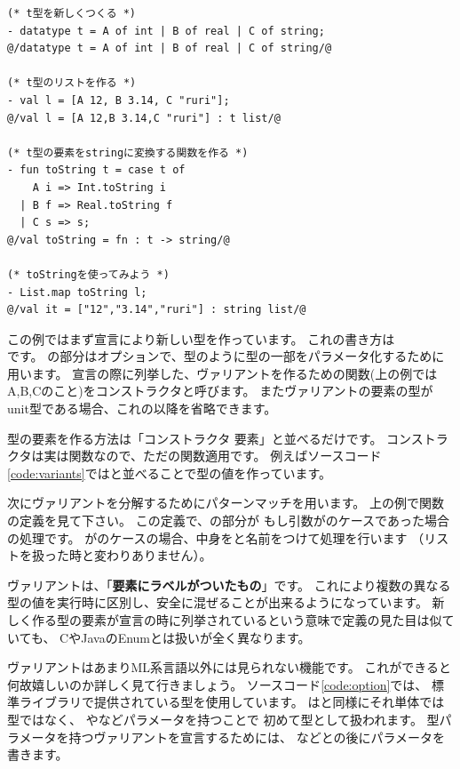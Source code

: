 \documentclass[11pt,a4paper]{jarticle}
\begin{document}
\begin{lstlisting}[caption=単純なヴァリアント,label=code:variants]
(* t型を新しくつくる *)
- datatype t = A of int | B of real | C of string;
@/datatype t = A of int | B of real | C of string/@

(* t型のリストを作る *)
- val l = [A 12, B 3.14, C "ruri"];
@/val l = [A 12,B 3.14,C "ruri"] : t list/@

(* t型の要素をstringに変換する関数を作る *)
- fun toString t = case t of
    A i => Int.toString i
  | B f => Real.toString f
  | C s => s;
@/val toString = fn : t -> string/@

(* toStringを使ってみよう *)
- List.map toString l;
@/val it = ["12","3.14","ruri"] : string list/@
\end{lstlisting}

この例ではまず宣言により新しい型を作っています。
これの書き方は\\です。
の部分はオプションで、型のように型の一部をパラメータ化するために用います。
宣言の際に列挙した、ヴァリアントを作るための関数(上の例ではA,B,Cのこと)をコンストラクタと呼びます。
またヴァリアントの要素の型がunit型である場合、これの以降を省略できます。

型の要素を作る方法は「コンストラクタ 要素」と並べるだけです。
コンストラクタは実は関数なので、ただの関数適用です。
例えばソースコード\ref{code:variants}ではと並べることで型の値を作っています。

次にヴァリアントを分解するためにパターンマッチを用います。
上の例で関数の定義を見て下さい。
この定義で、の部分が
もし引数がのケースであった場合の処理です。
がのケースの場合、中身をと名前をつけて処理を行います
（リストを扱った時と変わりありません）。

ヴァリアントは、「\textbf{要素にラベルがついたもの}」です。
これにより複数の異なる型の値を実行時に区別し、安全に混ぜることが出来るようになっています。
新しく作る型の要素が宣言の時に列挙されているという意味で定義の見た目は似ていても、
CやJavaのEnumとは扱いが全く異なります。

ヴァリアントはあまりML系言語以外には見られない機能です。
これができると何故嬉しいのか詳しく見て行きましょう。
ソースコード\ref{code:option}では、
標準ライブラリで提供されている型を使用しています。
はと同様にそれ単体では型ではなく、
やなどパラメータを持つことで
初めて型として扱われます。
型パラメータを持つヴァリアントを宣言するためには、
などとの後にパラメータを書きます。
\end{document}
